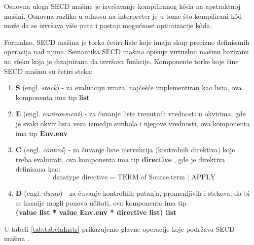 Osnovna uloga SECD mašine je izvršavanje kompiliranog k\^ oda na apstraktnoj mašini. Osnovna razlika u odnosu na interpreter je u tome što kompilirani k\^ od može da se izvršava više puta i postoji mogućnost optimizacije k\^oda. 

Formalno, SECD mašina je torka četiri liste koje imaju skup precizno definisanih operacija nad njima. Semantika SECD mašina opisuje virtuelnu mašinu baziranu na steku koja je dizajnirana da izvršava funkcije. Komponente torke koje čine SECD mašinu su četiri steka:
\begin{enumerate}
\item {\bf S} (engl. \textit{stack}) - za evaluaciju izraza, najčešće implementiran kao lista, ova komponenta ima tip {\bf list}  
\item {\bf E} (engl. \textit{environment}) - za čuvanje liste trenutnih vrednosti u okvirima, gde je svaki okvir lista veza izmedju simbola i njegove vrednosti, ova komponenta ima tip {\bf Env.env}  
\item {\bf C} (engl. \textit{control}) - za čuvanje liste instrukcija (kontrolnih direktiva) koje treba evaluirati, ova komponenta ima tip {\bf directive} , gde je direktiva definisana kao: $$ \text{datatype directive = TERM of Source.term | APPLY} $$
\item {\bf D} (engl. \textit{dump}) - za čuvanje kontrolnih putanja, promenljivih i stekova, da bi se kasnije mogli ponovo učitati, ova komponenta ima tip\\ {\bf(value list * value Env.env * directive list) list}
\end{enumerate}

\noindent U tabeli \ref{tab:tabelaInstr} prikazujemo glavne operacije koje podržava SECD mašina \cite{introduction-fp-systems}. \\

